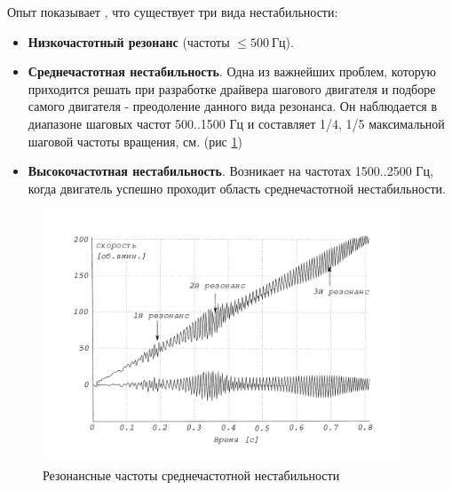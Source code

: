 Опыт показывает \cite[гл. 9]{RatmirovIvobotenko}, что существует три вида нестабильности:
\begin{itemize}
    \item \textbf{Низкочастотный резонанс} (частоты $ \le 500 ~\textit{Гц}$).

    \item \textbf{Среднечастотная нестабильность}. Одна из важнейших проблем, которую приходится решать при
            разработке драйвера шагового двигателя и подборе самого двигателя - преодоление данного
            вида резонанса. Он наблюдается в диапазоне шаговых частот 500..1500 Гц и составляет
            1/4, 1/5 максимальной шаговой частоты вращения, см. (рис \ref{pic_step_motor_reisonance_plot})

    \item \textbf{Высокочастотная нестабильность}. Возникает на частотах 1500..2500 Гц, когда двигатель успешно
            проходит область среднечастотной нестабильности.
\end{itemize}

\begin{figure}
    \centering
    \includegraphics[width=0.95\textwidth, keepaspectratio]{./src/pictures/step_motor_reisonance_plot}
    \caption{Резонансные частоты среднечастотной нестабильности}
    \label{pic_step_motor_reisonance_plot}
\end{figure}


